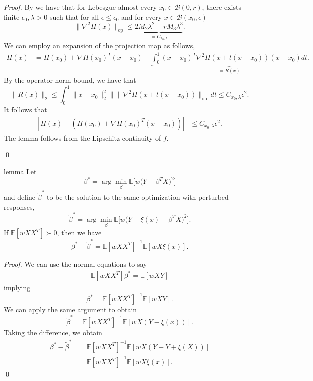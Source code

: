 \documentclass[11pt]{article}
\begin{document}
\noindent \textit{Proof.} By  we have that for Lebesgue almost every $x_0 \in \mathcal{B}(0,r)$, there exists finite $\epsilon_0, \lambda > 0$ such that for all $\epsilon \leq \epsilon_0$ and for every $x \in \mathcal{B}(x_0, \epsilon)$
\[\|\nabla^2\Pi(x)\|_{\text{op}} \leq \underbrace{2M_2\lambda^{2}+rM_3\lambda^{3}}_{= C_{x_0, \lambda}}.\]
We can employ an expansion of the projection map as follows,
\begin{align*}
    \Pi(x) &= \Pi(x_0) + \nabla\Pi(x_0)^{T}(x-x_0) + \underbrace{\int_{0}^{1}(x-x_0)^T\nabla^2\Pi(x+t(x-x_0))(x-x_0) dt}_{= R(x)}.
\end{align*}
By the operator norm bound, we have that
\[\|R(x)\|_2 \leq \int_{0}^{1}\|x - x_0\|_2^2\|\|\nabla^2\Pi(x+t(x-x_0))\|_{\text{op}} \,dt \leq C_{x_0, \lambda}\epsilon^2.\]
It follows that 
\begin{align}
    \left|\,\Pi(x) - \left(\Pi(x_0) + \nabla\Pi(x_0)^{T}(x-x_0)\right)\right| &\leq C_{x_0, \lambda}\epsilon^2.
\end{align}
The lemma follows from the Lipschitz continuity of $f$. 

\qed{}


\begin{restatable}[Perturbation]{lemma}{} \label{lemma: perturbation}
    Let 
    \[\beta^* = \arg\min_{\beta}\mathbb{E}\big[w\big(Y - \beta^{T}X\big)^2\big]\]
    and define $\tilde{\beta}^*$ to be the solution to the same optimization with perturbed responses,
    \[\tilde{\beta}^* = \arg\min_{\beta}\mathbb{E}\big[w\big(Y - \xi(x) - \beta^{T}X\big)^2\big].\]
    If $\mathbb{E}[wXX^T] \succ 0$, then we have
    \[\beta^* - \tilde{\beta}^* = \mathbb{E}[wXX^{T}]^{-1}\mathbb{E}[wX\xi(x)].\]
\end{restatable}
\noindent \textit{Proof.} We can use the normal equations to say
\begin{align*}
    \mathbb{E}[wXX^{T}]\beta^* = \mathbb{E}[wXY]
\end{align*}
implying 
\[\beta^* = \mathbb{E}[wXX^{T}]^{-1}\mathbb{E}[wXY].\]
We can apply the same argument to obtain 
\[\tilde{\beta}^* = \mathbb{E}[wXX^{T}]^{-1}\mathbb{E}[wX(Y - \xi(x))].\]
Taking the difference, we obtain
\begin{align*}
    \beta^* - \tilde{\beta}^* &= \mathbb{E}[wXX^{T}]^{-1}\mathbb{E}[wX(Y -  Y + \xi(X) )] \\
    &= \mathbb{E}[wXX^{T}]^{-1}\mathbb{E}[wX\xi(x)].
\end{align*}
\qed{}
\end{document}
